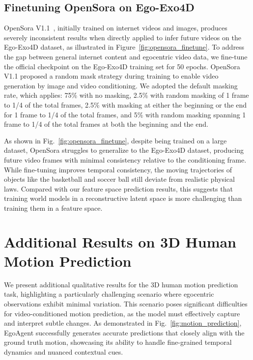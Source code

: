 \subsection{Finetuning OpenSora on Ego-Exo4D}

OpenSora V1.1~\cite{opensora}, initially trained on internet videos and images, produces severely inconsistent results when directly applied to infer future videos on the Ego-Exo4D dataset, as illustrated in Figure~\ref{fig:opensora_finetune}.
To address the gap between general internet content and egocentric video data, we fine-tune the official checkpoint on the Ego-Exo4D training set for 50 epochs.
OpenSora V1.1 proposed a random mask strategy during training to enable video generation by image and video conditioning. We adopted the default masking rate, which applies: 75\% with no masking, 2.5\% with random masking of 1 frame to 1/4 of the total frames, 2.5\% with masking at either the beginning or the end for 1 frame to 1/4 of the total frames, and 5\% with random masking spanning 1 frame to 1/4 of the total frames at both the beginning and the end.

As shown in Fig.~\ref{fig:opensora_finetune}, despite being trained on a large dataset, OpenSora struggles to generalize to the Ego-Exo4D dataset, producing future video frames with minimal consistency relative to the conditioning frame. While fine-tuning improves temporal consistency, the moving trajectories of objects like the basketball and soccer ball still deviate from realistic physical laws. Compared with our feature space prediction results, this suggests that training world models in a reconstructive latent space is more challenging than training them in a feature space.


\section{Additional Results on 3D Human Motion Prediction}

We present additional qualitative results for the 3D human motion prediction task, highlighting a particularly challenging scenario where egocentric observations exhibit minimal variation. This scenario poses significant difficulties for video-conditioned motion prediction, as the model must effectively capture and interpret subtle changes. As demonstrated in Fig.~\ref{fig:motion_prediction}, EgoAgent successfully generates accurate predictions that closely align with the ground truth motion, showcasing its ability to handle fine-grained temporal dynamics and nuanced contextual cues.

